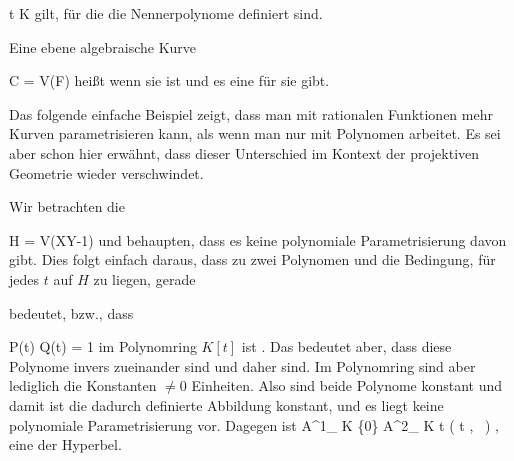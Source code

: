 \mavergleichskette
{\vergleichskette
{ t
}
{ \in }{ K
}
{  }{
}
{    }{
}
{   }{
}
}
{}{}{}
gilt, für die die Nennerpolynome definiert sind.


{}
{





Eine ebene algebraische Kurve

\mavergleichskette
{\vergleichskette
{C
}
{ = }{ V(F)
}
{  }{
}
{    }{
}
{   }{
}
}
{}{}{}
heißt  wenn sie
ist und es eine
für sie gibt.





}

Das folgende einfache Beispiel zeigt, dass man mit rationalen Funktionen mehr Kurven parametrisieren kann, als wenn man nur mit Polynomen arbeitet. Es sei aber schon hier erwähnt, dass dieser Unterschied im Kontext der projektiven Geometrie wieder verschwindet.

{





Wir betrachten die  {}

\mavergleichskette
{\vergleichskette
{H
}
{ = }{ V(XY-1)
}
{  }{
}
{    }{
}
{   }{
}
}
{}{}{}
und behaupten, dass es keine polynomiale Parametrisierung davon gibt. Dies folgt einfach daraus, dass zu zwei Polynomen
 und
 die Bedingung, für jedes $t$ auf $H$ zu liegen, gerade

 {  }

bedeutet, bzw., dass

\mavergleichskette
{\vergleichskette
{ P(t) \cdot Q(t)
}
{ = }{ 1
}
{  }{
}
{    }{
}
{   }{
}
}
{}{}{}
im Polynomring $K[t]$ ist
 {} {.}
Das bedeutet aber, dass diese Polynome invers zueinander sind und daher
sind. Im Polynomring sind aber lediglich die Konstanten $\neq 0$ Einheiten. Also sind beide Polynome konstant und damit ist die dadurch definierte Abbildung konstant, und es liegt keine polynomiale Parametrisierung vor. Dagegen ist
\maabbeledisp {} { {\mathbb A}^{1}_{ K } \setminus \{0\} } { {\mathbb A}^{2}_{ K }
} { t } { \left( t   , \,   {  }                   \right)
} {,}
eine
der Hyperbel.





}

